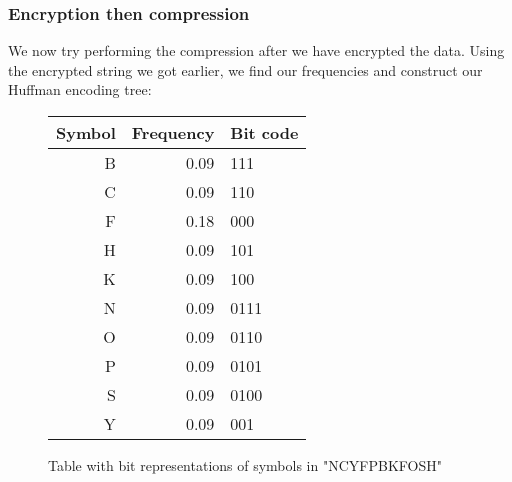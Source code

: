 \documentclass[11pt]{article}
\begin{document}
\subsubsection{Encryption then compression}\label{c-then-e-subsubsect}
We now try performing the compression after we have encrypted the data. Using the encrypted string we got earlier, we find 
our frequencies and construct our Huffman encoding tree:
\begin{figure}[H]\label{huffman-table2-fig}\begin{center}\begin{tabular}{ r | r | l }
	Symbol & Frequency & Bit code\\
	\hline
	B & 0.09 & 111\\
	C & 0.09 & 110\\
	F & 0.18 & 000\\
	H & 0.09 & 101\\
	K & 0.09 & 100\\
	N & 0.09 & 0111\\
	O & 0.09 & 0110\\
	P & 0.09 & 0101\\
	S & 0.09 & 0100\\
	Y & 0.09 & 001\\
\end{tabular}\caption{Table with bit representations of symbols in "NCYFPBKFOSH"}\end{center}\end{figure}
\end{document}
